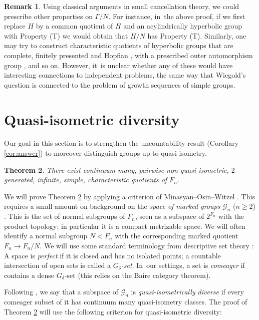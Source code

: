 \documentclass[JEP,XML,SOM,Unicode]{cedram}
\newtheorem{theorem}{Theorem}[section]
\theoremstyle{definition}
\newtheorem{remark}[theorem]{Remark}
\newcommand{\Gn}{\mathcal{G}_n}
\begin{document}
\begin{remark}
\label{rem:T}
Using classical arguments in small cancellation theory, we could prescribe other properties on $\Gamma/N$.
For instance, in~the above proof, if we first replace $H$ by a common quotient of $H$ and an acylindrically hyperbolic group with Property (T) \cite[Cor.\,1.6]{hull} we would obtain that $H/N$ has Property (T).
Similarly, one may try to construct characteristic quotients of hyperbolic groups that are complete, finitely presented and Hopfian \cite[Th.\,10.4]{Lyndon:2001wm}, with a prescribed outer automorphism group \cite{rips:out}, and so on.
However, it~is unclear whether any of these would have interesting connections to independent problems, the same way that Wiegold's question \cite[Quest.\,6.45]{kourovka} is connected to the problem of growth sequences of simple groups.
\end{remark}

\section{Quasi-isometric diversity}
\label{s:QI}

Our goal in this section is to strengthen the uncountability result (Corollary \ref{cor:answer}) to moreover distinguish groups up to quasi-isometry.

\begin{theorem}
\label{thm:QI}
There exist continuum many, pairwise non-quasi-isometric, $2$\nobreakdash-gen\-erated, infinite, simple, characteristic quotients of $F_n$.
\end{theorem}

We will prove Theorem \ref{thm:QI} by applying a criterion of Minasyan--Osin--Witzel \cite{diversity}. This requires a small amount on background on the \emph{space of marked groups} $\Gn$ ($n \geq 2$) \cite{grigorchuk}. This is the set of normal subgroups of $F_n$, seen as a subspace of $2^{F_n}$ with the product topology; in particular it is a compact metrizable space. We will often identify a normal subgroup $N < F_n$ with the corresponding marked quotient $F_n \to F_n / N$. We will use some standard terminology from descriptive set theory \cite[I.8]{kechris}: A space is \emph{perfect} if it is closed and has no isolated points; a countable intersection of open sets is called a \emph{$G_\delta$-set}. In~our settings, a set is \emph{comeager} if contains a dense $G_\delta$-set (this relies on the Baire category theorem).

Following \cite{diversity}, we say that a subspace of $\Gn$ is \emph{quasi-isometrically diverse} if every comeager subset of it has continuum many quasi-isometry classes.
The proof of Theorem \ref{thm:QI} will use the following criterion for quasi-isometric diversity:
\end{document}
